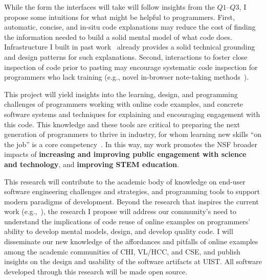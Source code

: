 \documentclass[12pt]{memoir}
\begin{document}
While the form the interfaces will take will follow insights from the $Q1$--$Q3$, I propose some intuitions for what might be helpful to programmers.
First, automatic, concise, and in-situ code explanations may reduce the cost of finding the information needed to build a solid mental model of what code does.
Infrastructure I built in past work~\cite{head_tutorons_2015} already provides a solid technical grounding and design patterns for such explanations.
Second, interactions to foster close inspection of code prior to pasting may encourage systematic code inspection for programmers who lack training (e.g., novel in-browser note-taking methods~\cite{bauer_selection-based_2007}).

This project will yield insights into the learning, design, and programming challenges of programmers working with online code examples, and concrete software systems and techniques for explaining and encouraging engagement with this code.
This knowledge and these tools are critical to preparing the next generation of programmers to thrive in industry, for whom learning new skills ``on the job'' is a core competency~\cite{exter_exploring_2012}.
In this way, my work promotes the NSF broader impacts of \textbf{increasing and improving public engagement with science and technology}, and \textbf{improving STEM education}.

This research will contribute to the academic body of knowledge on end-user software engineering challenges and strategies, and programming tools to support modern paradigms of development.
Beyond the research that inspires the current work (e.g.,~\cite{brandt_two_2009,ichinco_exploring_2015}),
the research I propose will address our community's need to understand the implications of code reuse of online examples on programmers' ability to develop mental models, design, and develop quality code.
I will disseminate our new knowledge of the affordances and pitfalls of online examples among the academic communities of CHI, VL/HCC, and CSE\@, and publish insights on the design and usability of the software artifacts at UIST\@.
All software developed through this research will be made open source.

\printbibliography[heading=none]
\end{document}
